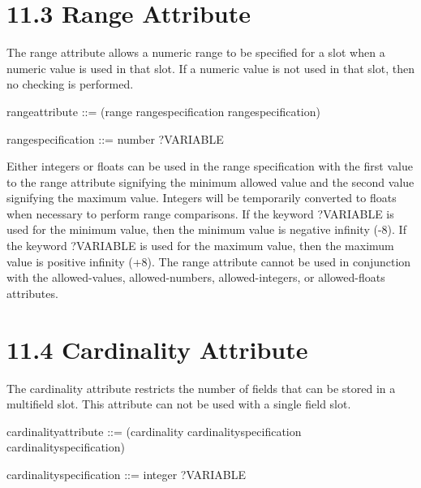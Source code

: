\documentclass[letterpaper,10pt,english]{sphinxmanual}
\begin{document}
\section{11.3 Range Attribute}
\label{\detokenize{constraints:range-attribute}}
The range attribute allows a numeric range to be specified for a slot
when a numeric value is used in that slot. If a numeric value is not
used in that slot, then no checking is performed.


\begin{sphinxVerbatim}[commandchars=\\\{\}]
\PYGZlt{}range\PYGZhy{}attribute\PYGZgt{} ::= (range \PYGZlt{}range\PYGZhy{}specification\PYGZgt{} \PYGZlt{}range\PYGZhy{}specification\PYGZgt{})

\PYGZlt{}range\PYGZhy{}specification\PYGZgt{} ::= \PYGZlt{}number\PYGZgt{} \textbar{} ?VARIABLE
\end{sphinxVerbatim}

Either integers or floats can be used in the range specification with
the first value to the range attribute signifying the minimum allowed
value and the second value signifying the maximum value. Integers will
be temporarily converted to floats when necessary to perform range
comparisons. If the keyword ?VARIABLE is used for the minimum value,
then the minimum value is negative infinity (-8). If the keyword
?VARIABLE is used for the maximum value, then the maximum value is
positive infinity (+8). The range attribute cannot be used in
conjunction with the allowed-values, allowed-numbers, allowed-integers,
or allowed-floats attributes.


\section{11.4 Cardinality Attribute}
\label{\detokenize{constraints:cardinality-attribute}}
The cardinality attribute restricts the number of fields that can be
stored in a multifield slot. This attribute can not be used with a
single field slot.


\begin{sphinxVerbatim}[commandchars=\\\{\}]
\PYGZlt{}cardinality\PYGZhy{}attribute\PYGZgt{} ::= (cardinality \PYGZlt{}cardinality\PYGZhy{}specification\PYGZgt{}
                                \PYGZlt{}cardinality\PYGZhy{}specification\PYGZgt{})

\PYGZlt{}cardinality\PYGZhy{}specification\PYGZgt{} ::= \PYGZlt{}integer\PYGZgt{} \textbar{} ?VARIABLE
\end{sphinxVerbatim}
\end{document}
